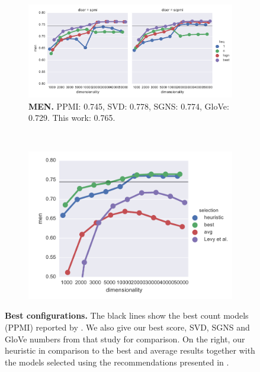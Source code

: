 \begin{figure}
  \begin{subfigure}[t]{0.6\textwidth}
    \includegraphics[width=\textwidth]{supplement/figures/men-best}
    \caption{\scriptsize \textbf{MEN.}
      PPMI: 0.745,
      SVD: 0.778,
      SGNS: 0.774,
      GloVe: 0.729.
      This work: 0.765.
    }
    \label{fig:best-men}
  \end{subfigure}
  ~
  \begin{subfigure}[t]{0.37\textwidth}
    \includegraphics[width=\textwidth]{supplement/figures/men-global-best}
    \caption{}
    \label{fig:global-best-men}
  \end{subfigure}

  \caption{\small\textbf{Best configurations.} The black lines show the best count models (PPMI) reported by \protect{}. We also give our best score, SVD, SGNS and GloVe numbers from that study for comparison. On the right, our heuristic in comparison to the best and average results together with the models selected using the recommendations presented in \protect{}.}
  \label{fig:best}
\end{figure}

